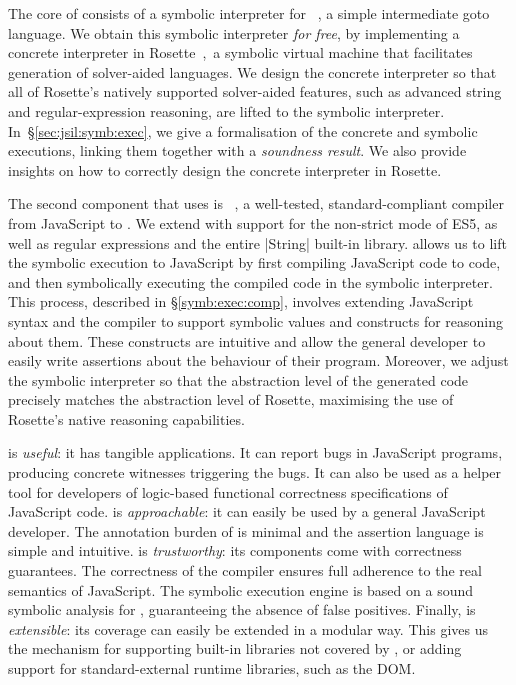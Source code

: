 The core of \jilette consists of a symbolic interpreter for
\jsil~\cite{javert}, a simple intermediate goto language. 
We obtain this symbolic interpreter \emph{for free}, 
by implementing a concrete \jsil interpreter in Rosette~\cite{Rosette2,Rosette1},~a 
symbolic virtual machine that facilitates generation of solver-aided languages.
We design the concrete interpreter so that all of Rosette's natively supported solver-aided
features, such as advanced string and regular-expression reasoning, 
are lifted to the \jsil symbolic interpreter. 
In~\S\ref{sec:jsil:symb:exec}, we give a formalisation of the \jsil concrete and symbolic executions, linking them together with a {\em soundness result}. We also provide insights on how to correctly design the concrete \jsil interpreter in Rosette.


The second component that \jilette uses is \JSComp~\cite{javert}, 
a well-tested, standard-compliant compiler from JavaScript to \jsil. We extend
\JSComp with support for the non-strict mode of ES5, as well as
regular expressions and the entire \jsinline|String| built-in library.
\JSComp allows us to lift the \jsil symbolic execution to JavaScript by first compiling JavaScript code to \jsil code, and
then symbolically executing the compiled code in the 
\jsil symbolic interpreter. This process, described in \S\ref{symb:exec:comp},
involves extending JavaScript syntax and the \JSComp compiler to support symbolic values and 
constructs for reasoning about them. These constructs are intuitive
and allow the general developer to easily write assertions about the behaviour
of their program. 
Moreover, we adjust the \jsil symbolic interpreter so that the abstraction level 
of the generated \jsil code precisely matches the abstraction level of Rosette, 
 maximising the use of Rosette's native reasoning capabilities.


\jilette is \emph{useful}: it has tangible applications. 
It can report bugs in JavaScript programs, producing concrete witnesses triggering the bugs. It can also be used as a helper tool for developers of logic-based functional correctness specifications of JavaScript code.
\jilette is \emph{approachable}: it can easily be used by a general JavaScript developer. The annotation burden of \jilette is minimal and the assertion language is simple and intuitive. 
\jilette is \emph{trustworthy}: its components come with correctness guarantees. 
The correctness of the \JSComp compiler ensures full adherence to the real semantics of JavaScript. The \jilette symbolic execution engine is based on a sound symbolic
analysis for \jsil, guaranteeing the absence of false positives. 
Finally, \jilette is \emph{extensible}: its coverage can easily be extended in a modular way. This gives us the mechanism for supporting built-in libraries not covered by \JSComp, or adding support for standard-external runtime libraries, such as the DOM.